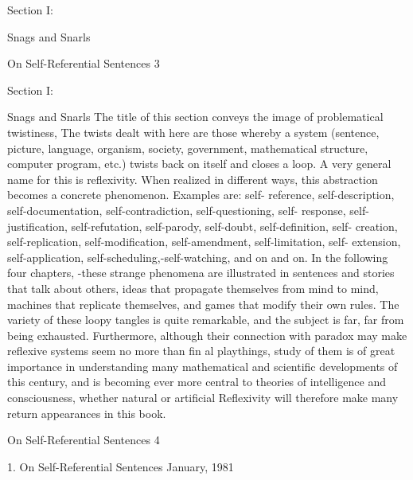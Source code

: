                                        Section I:

                                Snags and Snarls




On Self-Referential Sentences                   3

                                                                              Section I:

                                                                 Snags and Snarls
        The title of this section conveys the image of problematical twistiness, The twists
dealt with here are those whereby a system (sentence, picture, language, organism,
society, government, mathematical structure, computer program, etc.) twists back on
itself and closes a loop. A very general name for this is reflexivity. When realized in
different ways, this abstraction becomes a concrete phenomenon. Examples are: self-
reference, self-description, self-documentation, self-contradiction, self-questioning, self-
response, self-justification, self-refutation, self-parody, self-doubt, self-definition, self-
creation, self-replication, self-modification, self-amendment, self-limitation, self-
extension, self-application, self-scheduling,-self-watching, and on and on. In the
following four chapters, -these strange phenomena are illustrated in sentences and stories
that talk about others, ideas that propagate themselves from mind to mind, machines that
replicate themselves, and games that modify their own rules. The variety of these loopy
tangles is quite remarkable, and the subject is far, far from being exhausted. Furthermore,
although their connection with paradox may make reflexive systems seem no more than
fin al playthings, study of them is of great importance in understanding many
mathematical and scientific developments of this century, and is becoming ever more
central to theories of intelligence and consciousness, whether natural or artificial
Reflexivity will therefore make many return appearances in this book.




On Self-Referential Sentences                                                               4

                                                1.
                     On Self-Referential Sentences
                                     January, 1981


